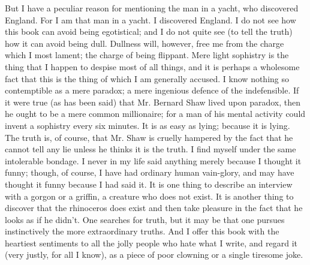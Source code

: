 \documentclass{book}
\begin{document}
But I have a peculiar reason for mentioning the man in a yacht, who discovered England. For I am that man in a yacht. I discovered England. I do not see how this book can avoid being egotistical; and I do not quite see (to tell the truth) how it can avoid being dull. Dullness will, however, free me from the charge which I most lament; the charge of being flippant. Mere light sophistry is the thing that I happen to despise most of all things, and it is perhaps a wholesome fact that this is the thing of which I am generally accused. I know nothing so contemptible as a mere paradox; a mere ingenious defence of the indefensible. If it were true (as has been said) that Mr. Bernard Shaw lived upon paradox, then he ought to be a mere common millionaire; for a man of his mental activity could invent a sophistry every six minutes. It is as easy as lying; because it is lying. The truth is, of course, that Mr. Shaw is cruelly hampered by the fact that he cannot tell any lie unless he thinks it is the truth. I find myself under the same intolerable bondage. I never in my life said anything merely because I thought it funny; though, of course, I have had ordinary human vain-glory, and may have thought it funny because I had said it. It is one thing to describe an interview with a gorgon or a griffin, a creature who does not exist. It is another thing to discover that the rhinoceros does exist and then take pleasure in the fact that he looks as if he didn’t. One searches for truth, but it may be that one pursues instinctively the more extraordinary truths. And I offer this book with the heartiest sentiments to all the jolly people who hate what I write, and regard it (very justly, for all I know), as a piece of poor clowning or a single tiresome joke.
\end{document}
